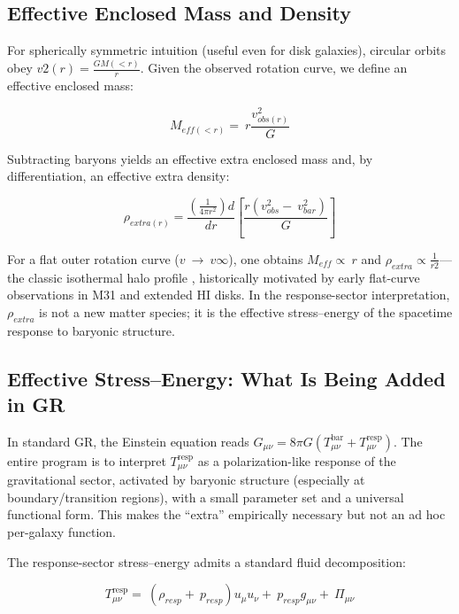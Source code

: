 \documentclass[11pt]{article}
\begin{document}
\subsection{Effective Enclosed Mass and Density}\label{effective-enclosed-mass-and-density}

For spherically symmetric intuition (useful even for disk galaxies), circular orbits obey \(v2(r) = \frac{GM( < r)}{r}\). Given the observed rotation curve, we define an effective enclosed mass:

\[M_{eff( < r)} = \ r\frac{v_{obs(r)}^{2}}{G}\]

Subtracting baryons yields an effective extra enclosed mass and, by differentiation, an effective extra density:

\[\rho_{extra(r)} = \frac{\left( \frac{1}{4\pi r^{2}} \right)d}{dr}\left\lbrack \frac{r\left( v_{obs}^{2} - \ v_{bar}^{2} \right)}{G} \right\rbrack\]

For a flat outer rotation curve (\(v\  \rightarrow \ v\infty\)), one obtains \(M_{eff} \propto \ r\) and \(\rho_{extra} \propto \frac{1}{r2}\)---the classic isothermal halo profile \citep{RubinFord1970M31, Bosma1978Thesis}, historically motivated by early flat-curve observations in M31 and extended HI disks. In the response-sector interpretation, \(\rho_{extra}\) is not a new matter species; it is the effective stress--energy of the spacetime response to baryonic structure.

\subsection{Effective Stress--Energy: What Is Being Added in GR}\label{effective-stressenergy-what-is-being-added-in-gr}

In standard GR, the Einstein equation reads \(G_{\mu\nu} = 8\pi G\left( T_{\mu\nu}^{\text{bar}} + T_{\mu\nu}^{\text{resp}} \right)\). The entire program is to interpret \(T_{\mu\nu}^{\text{resp}}\) as a polarization-like response of the gravitational sector, activated by baryonic structure (especially at boundary/transition regions), with a small parameter set and a universal functional form. This makes the ``extra'' empirically necessary but not an ad hoc per-galaxy function.

The response-sector stress--energy admits a standard fluid decomposition:

\[T^{\text{resp}}_{\mu\nu} = \ \left( \rho_{resp} + \ p_{resp} \right)u_{\mu}u_{\nu} + \ p_{resp}g_{\mu\nu} + \ \Pi_{\mu\nu}\]
\end{document}
